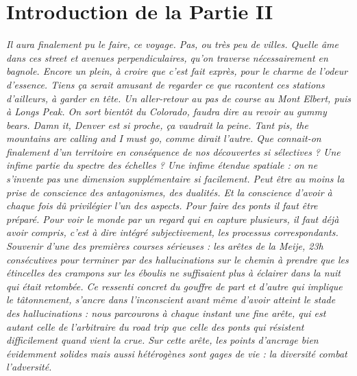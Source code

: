 


\chapter*{Introduction de la Partie II}









\bigskip




\textit{Il aura finalement pu le faire, ce voyage. Pas, ou très peu de villes. Quelle âme dans ces \emph{street} et \emph{avenues} perpendiculaires, qu'on traverse nécessairement en bagnole. Encore un plein, à croire que c'est fait exprès, pour le charme de l'odeur d'essence. Tiens ça serait amusant de regarder ce que racontent ces stations d'ailleurs, à garder en tête. Un aller-retour au pas de course au Mont Elbert, puis à Longs Peak. On sort bientôt du Colorado, faudra dire au revoir au gummy bears. Damn it, Denver est si proche, ça vaudrait la peine. Tant pis, the mountains are calling and I must go, comme dirait l'autre. Que connait-on finalement d'un territoire en conséquence de nos découvertes si sélectives ? Une infime partie du spectre des échelles ? Une infime étendue spatiale : on ne s'invente pas une dimension supplémentaire si facilement. Peut être au moins la prise de conscience des antagonismes, des dualités. Et la conscience d'avoir à chaque fois dû privilégier l'un des aspects. Pour faire des ponts il faut être préparé. Pour voir le monde par un regard qui en capture plusieurs, il faut déjà avoir \emph{compris}, c'est à dire intégré subjectivement, les processus correspondants. Souvenir d'une des premières courses sérieuses : les arêtes de la Meije, 23h consécutives pour terminer par des hallucinations sur le chemin à prendre que les étincelles des crampons sur les éboulis ne suffisaient plus à éclairer dans la nuit qui était retombée. Ce ressenti concret du gouffre de part et d'autre qui implique le tâtonnement, s'ancre dans l'inconscient avant même d'avoir atteint le stade des hallucinations : nous parcourons à chaque instant une fine arête, qui est autant celle de l'arbitraire du road trip que celle des ponts qui résistent difficilement quand vient la crue. Sur cette arête, les points d'ancrage bien évidemment solides mais aussi hétérogènes sont gages de vie : la diversité combat l'adversité.}

